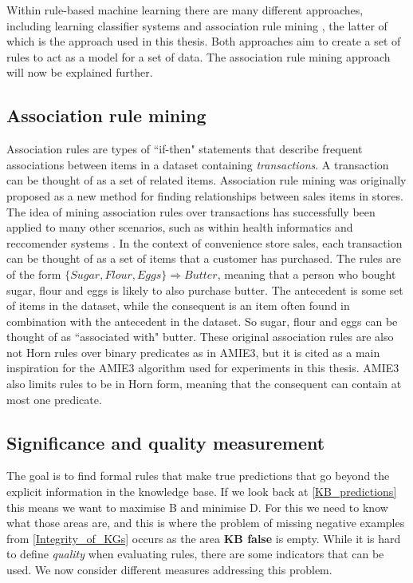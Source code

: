Within rule-based machine learning there are many different approaches, including learning classifier systems \cite{sigaud2007learning} and association rule mining \cite{agrawal1993mining}, the latter of which is the approach used in this thesis. Both approaches aim to create a set of rules to act as a model for a set of data. The association rule mining approach will now be explained further.


\subsection{Association rule mining}
Association rules \cite{agrawal1993mining} are types of ``if-then" statements that describe frequent associations between items in a dataset containing \textit{transactions}. A transaction can be thought of as a set of related items. Association rule mining was originally proposed as a new method for finding relationships between sales items in stores. The idea of mining association rules over transactions has successfully been applied to many other scenarios, such as within health informatics and reccomender systems \cite{altaf2017applications, lin2002efficient}. In the context of convenience store sales, each transaction can be thought of as a set of items that a customer has purchased. The rules are of the form $\{Sugar, Flour, Eggs\} \Rightarrow Butter$, meaning that a person who bought sugar, flour and eggs is likely to also purchase butter. The antecedent is some set of items in the dataset, while the consequent is an item often found in combination with the antecedent in the dataset.  So sugar, flour and eggs can be thought of as ``associated with" butter. These original association rules are also not Horn rules over binary predicates as in AMIE3, but it is cited as a main inspiration for the AMIE3 algorithm used for experiments in this thesis. AMIE3 also limits rules to be in Horn form, meaning that the consequent can contain at most one predicate.

\subsection{Significance and quality measurement}
\label{significance_and_quality}
The goal is to find formal rules that make true predictions that go beyond the explicit information in the knowledge base. If we look back at \cref{KB_predictions} this means we want to maximise B and minimise D. For this we need to know what those areas are, and this is where the problem of missing negative examples from \cref{Integrity_of_KGs} occurs as the area \textbf{KB false} is empty. While it is hard to define \textit{quality} when evaluating rules, there are some indicators that can be used. We now consider different measures addressing this problem.

